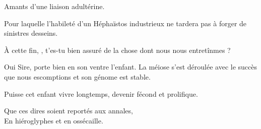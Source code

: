 \begin{drama}
  \alexasspeaks {}Amants d’une liaison adultérine.

  \elenaspeaks Pour laquelle l’habileté d’un Héphaïstos industrieux ne tardera pas à forger de sinistres desseins.

               À cette fin, \alexas, t’es-tu bien assuré de la chose dont nous nous entretînmes ?
  
  \alexasspeaks Oui Sire, \catin{} porte bien en son ventre l’enfant. La méiose s’est déroulée avec le succès que nous escomptions et son génome est stable.

  \elenaspeaks Puisse cet enfant vivre longtemps, devenir fécond et prolifique.

  \alexasspeaks
  \begin{minipage}[t]{\linewidth}
    Que ces dires soient reportés aux annales,\\
    En hiéroglyphes et en ossécaille.
  \end{minipage}
\end{drama}

\scene


\StageDirII{\reine, \princesse}



